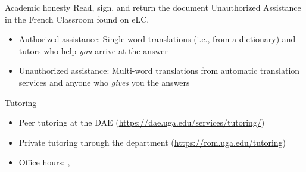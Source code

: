 \begin{frame}{Academic honesty}
  Read, sign, and return the document Unauthorized Assistance in the French Classroom found on eLC.
  \begin{itemize}
    \item Authorized assistance: \alert{Single word} translations (i.e., from a dictionary) and tutors who help \emph{you} arrive at the answer
    \item Unauthorized assistance: \alert{Multi-word} translations from automatic translation services and anyone who \emph{gives} you the answers
  \end{itemize}
\end{frame}

\begin{frame}{Tutoring}
  \begin{itemize}
    \item Peer tutoring at the DAE (\url{https://dae.uga.edu/services/tutoring/})
    \item Private tutoring through the department (\url{https://rom.uga.edu/tutoring})
    \item Office hours: , 
  \end{itemize}
\end{frame}
